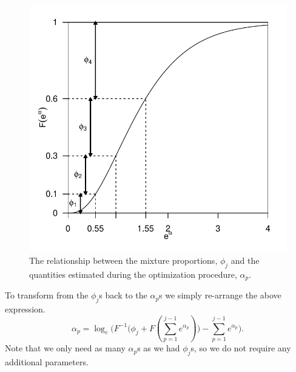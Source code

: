 \documentclass[10pt]{article}
\begin{document}
\begin{figure}
\centering
\includegraphics{figs/phidia.pdf}
\caption{The relationship between the mixture proportions, $\phi_j$ and the quantities estimated during the optimization procedure, $\alpha_p$.}
\label{mmds-phifig}
\end{figure}

To transform from the $\phi_j$s back to the $\alpha_p$s we simply re-arrange the above expression.
\begin{equation*}
\alpha_p = \log_e \Big(F^{-1}\Big(\phi_j + F(\sum_{p=1}^{j-1} e^{\alpha_p})\Big) - \sum_{p=1}^{j-1} e^{\alpha_p}\Big).
\end{equation*}
Note that we only need as many $\alpha_p$s as we had $\phi_j$s, so we do not require any additional parameters.



\end{document}
